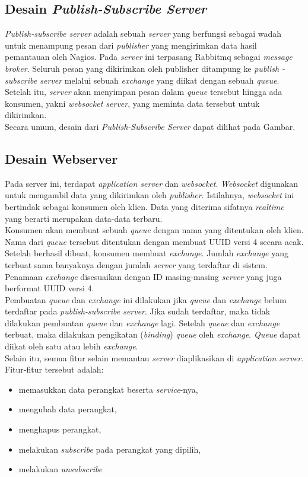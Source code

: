 \subsection{Desain \textit{Publish-Subscribe Server}}
\tab \textit{Publish-subscribe server} adalah sebuah \textit{server} yang berfungsi sebagai wadah untuk menampung pesan dari \textit{publisher} yang mengirimkan data hasil pemantauan oleh Nagios. Pada \textit{server} ini terpasang Rabbitmq sebagai \textit{message broker}. Seluruh pesan yang dikirimkan oleh publisher ditampung ke \textit{publish -subscribe server} melalui sebuah \textit{exchange} yang diikat dengan sebuah \textit{queue}. Setelah itu, \textit{server} akan menyimpan pesan dalam \textit{queue} tersebut hingga ada konsumen, yakni \textit{websocket server}, yang meminta data tersebut untuk dikirimkan. \\
\tab Secara umum, desain dari \textit{Publish-Subscribe Server} dapat
dilihat pada Gambar. \\

\subsection{Desain Webserver}
\tab Pada server ini, terdapat \textit{application server} dan \textit{websocket}. \textit{Websocket} digunakan untuk mengambil data yang dikirimkan oleh \textit{publisher}. Istilahnya, \textit{websocket} ini bertindak sebagai konsumen oleh klien. Data yang diterima sifatnya \textit{realtime} yang berarti merupakan data-data terbaru. \\
\tab Konsumen akan membuat sebuah \textit{queue} dengan nama yang ditentukan oleh klien. Nama dari \textit{queue} tersebut ditentukan dengan membuat  UUID versi 4 secara acak. Setelah  berhasil dibuat, konsumen membuat \textit{exchange}. Jumlah \textit{exchange} yang terbuat sama banyaknya dengan jumlah \textit{server} yang terdaftar di sistem. Penamaan \textit{exchange} disesuaikan dengan ID masing-masing \textit{server} yang juga berformat UUID versi 4. \\
\tab Pembuatan \textit{queue} dan \textit{exchange} ini dilakukan jika \textit{queue} dan \textit{exchange} belum terdaftar pada \textit{publish-subscribe server}. Jika sudah terdaftar, maka tidak dilakukan pembuatan \textit{queue} dan \textit{exchange} lagi. Setelah \textit{queue} dan \textit{exchange} terbuat, maka dilakukan pengikatan (\textit{binding}) \textit{queue} oleh \textit{exchange}. \textit{Queue} dapat diikat oleh satu atau lebih \textit{exchange}. \\
\tab Selain itu, semua fitur selain memantau \textit{server} diaplikasikan di \textit{application server}. Fitur-fitur tersebut adalah:
	\begin{itemize}
	\item memasukkan data perangkat beserta \textit{service}-nya,
	\item mengubah data perangkat,
	\item menghapus perangkat,
	\item melakukan \textit{subscribe} pada perangkat yang dipilih,
	\item melakukan \textit{unsubscribe}
	\end{itemize}
	

